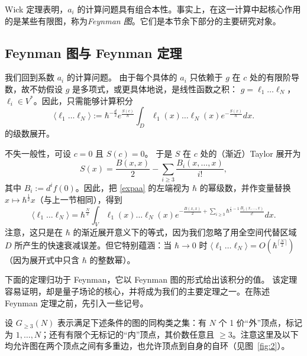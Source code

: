 Wick 定理表明，$a_i$ 的计算问题具有组合本性。事实上，在这一计算中起核心作用的是某些有限图，称为\emph{Feynman 图}。它们是本节余下部分的主要研究对象。


\subsection{Feynman 图与 Feynman 定理} \label{fdft}
我们回到系数 $a_i$ 的计算问题。
由于每个具体的 $a_i$ 只依赖于 $g$ 在 $c$ 处的有限阶导数，故不妨假设 $g$ 是多项式，或更具体地说，是线性函数之积：
$g=\ell_1 \ldots \ell_N$，$\ell_i\in V^*$。因此，只需能够计算积分
\begin{equation}\label{expaa}
\langle\ell_1 \ldots \ell_N\rangle:= \hbar^{-\frac{d}{2}}e^{\frac{S(c)}{\hbar}}\int_{D}
\ell_1(x) \ldots\ell_N(x)e^{-\frac{S(x)}{\hbar}}dx.
\end{equation}
的级数展开。

不失一般性，可设 $c=0$ 且 $S(c)=0$。
于是 $S$ 在 $c$ 处的（渐近）Taylor 展开为
$$
S(x)=\frac{B(x,x)}{2}-\sum_{i\ge 3}\frac{B_i(x,\ldots,x)}{i!},
$$
其中 $B_i:=d^if(0)$。因此，把 \eqref{expaa} 的左端视为 $\hbar$ 的幂级数，并作变量替换 $x\mapsto \hbar^{\frac{1}{2}}x$（与上一节相同），得到
$$
\langle\ell_1 \ldots \ell_N\rangle=
\hbar^{\frac{N}{2}}\int_V \ell_1(x) \ldots \ell_N(x)e^{-\frac{B(x,x)}{2}+
\sum_{i\ge 3}\hbar^{\frac{i}{2}-1}\frac{B_i(x, \ldots ,x)}{i!}}dx.
$$
注意，这只是在 $\hbar$ 的渐近展开意义下的等式，因为我们忽略了用全空间代替区域 $D$ 所产生的快速衰减误差。但它特别蕴涵：当 $\hbar\to 0$ 时 $\langle\ell_1 \ldots \ell_N\rangle=O(\hbar^{\lceil\frac{N}{2}\rceil})$（因为展开式中只含 $\hbar$ 的整数幂）。

下面的定理归功于 Feynman，它以 Feynman 图的形式给出该积分的值。
该定理容易证明，却是量子场论的核心，并将成为我们的主要定理之一。在陈述 Feynman 定理之前，先引入一些记号。

设 $G_{\ge 3}(N)$ 表示满足下述条件的图的同构类之集：有 $N$ 个 1 价“外”顶点，标记为 $1, \ldots ,N$；还有有限个无标记的“内”顶点，其价数任意且 $\ge 3$。注意这里及以下均允许图在两个顶点之间有多重边，也允许顶点到自身的自环（见图~\ref{fig:2}）。

